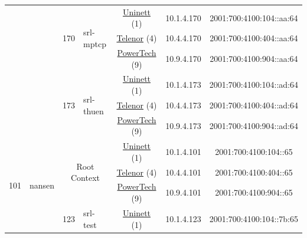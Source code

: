 \begin{small}
\begin{center}
\begin{longtable}{|c|c|c|c|c|c|c|c|}
  &  & \multirow{3}{*}{\tiny{170}} & \multicolumn{1}{|l|}{\multirow{3}{*}{\tiny{srl-mptcp}}} & \multicolumn{2}{|c|}{\tiny{\href{https://www.uninett.no}{Uninett} (1)}} & \tiny{10.1.4.170} & \tiny{2001:700:4100:104::aa:64} \\* \cline{5-5}\cline{6-6}\cline{7-7}\cline{8-8}
  &  &  &  & \multicolumn{2}{|c|}{\tiny{\href{https://www.telenor.no}{Telenor} (4)}} & \tiny{10.4.4.170} & \tiny{2001:700:4100:404::aa:64} \\* \cline{5-5}\cline{6-6}\cline{7-7}\cline{8-8}
  &  &  &  & \multicolumn{2}{|c|}{\tiny{\href{http://www.powertech.no}{PowerTech} (9)}} & \tiny{10.9.4.170} & \tiny{2001:700:4100:904::aa:64} \\* \cline{3-3}\cline{4-4}\cline{5-5}\cline{6-6}\cline{7-7}\cline{8-8}
  &  & \multirow{3}{*}{\tiny{173}} & \multicolumn{1}{|l|}{\multirow{3}{*}{\tiny{srl-thuen}}} & \multicolumn{2}{|c|}{\tiny{\href{https://www.uninett.no}{Uninett} (1)}} & \tiny{10.1.4.173} & \tiny{2001:700:4100:104::ad:64} \\* \cline{5-5}\cline{6-6}\cline{7-7}\cline{8-8}
  &  &  &  & \multicolumn{2}{|c|}{\tiny{\href{https://www.telenor.no}{Telenor} (4)}} & \tiny{10.4.4.173} & \tiny{2001:700:4100:404::ad:64} \\* \cline{5-5}\cline{6-6}\cline{7-7}\cline{8-8}
  &  &  &  & \multicolumn{2}{|c|}{\tiny{\href{http://www.powertech.no}{PowerTech} (9)}} & \tiny{10.9.4.173} & \tiny{2001:700:4100:904::ad:64} \\ \hline
 \multirow{36}{*}{\tiny{101}} & \multicolumn{1}{|l|}{\multirow{36}{*}{\tiny{nansen}}} & \multicolumn{2}{|c|}{\multirow{3}{*}{\tiny{Root Context}}} & \multicolumn{2}{|c|}{\tiny{\href{https://www.uninett.no}{Uninett} (1)}} & \tiny{10.1.4.101} & \tiny{2001:700:4100:104::65} \\* \cline{5-5}\cline{6-6}\cline{7-7}\cline{8-8}
  &  & \multicolumn{2}{|c|}{} & \multicolumn{2}{|c|}{\tiny{\href{https://www.telenor.no}{Telenor} (4)}} & \tiny{10.4.4.101} & \tiny{2001:700:4100:404::65} \\* \cline{5-5}\cline{6-6}\cline{7-7}\cline{8-8}
  &  & \multicolumn{2}{|c|}{} & \multicolumn{2}{|c|}{\tiny{\href{http://www.powertech.no}{PowerTech} (9)}} & \tiny{10.9.4.101} & \tiny{2001:700:4100:904::65} \\* \cline{3-3}\cline{4-4}\cline{5-5}\cline{6-6}\cline{7-7}\cline{8-8}
  &  & \multirow{3}{*}{\tiny{123}} & \multicolumn{1}{|l|}{\multirow{3}{*}{\tiny{srl-test}}} & \multicolumn{2}{|c|}{\tiny{\href{https://www.uninett.no}{Uninett} (1)}} & \tiny{10.1.4.123} & \tiny{2001:700:4100:104::7b:65} \\* \cline{5-5}\cline{6-6}\cline{7-7}\cline{8-8}

\end{longtable}
\end{center}
\end{small}
